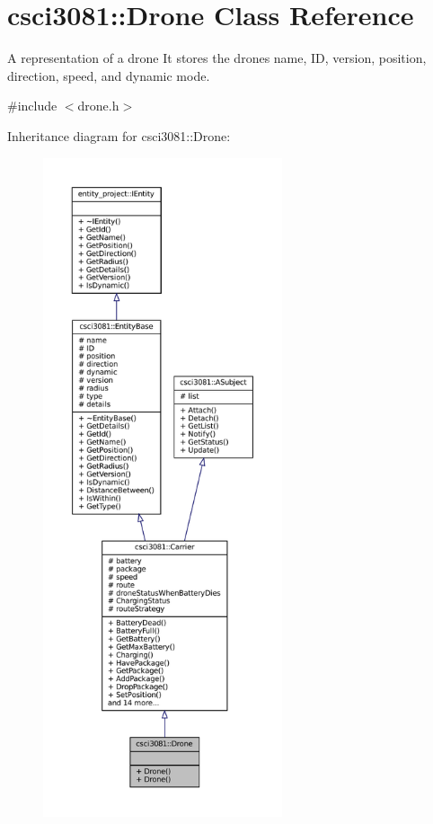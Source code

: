 \hypertarget{classcsci3081_1_1Drone}{}\section{csci3081\+:\+:Drone Class Reference}
\label{classcsci3081_1_1Drone}


A representation of a drone It stores the drone\textquotesingle{}s name, ID, version, position, direction, speed, and dynamic mode.  




{\ttfamily \#include $<$drone.\+h$>$}



Inheritance diagram for csci3081\+:\+:Drone\+:
\nopagebreak
\begin{figure}[H]
\begin{center}
\leavevmode
\includegraphics[height=550pt]{classcsci3081_1_1Drone__inherit__graph}
\end{center}
\end{figure}
